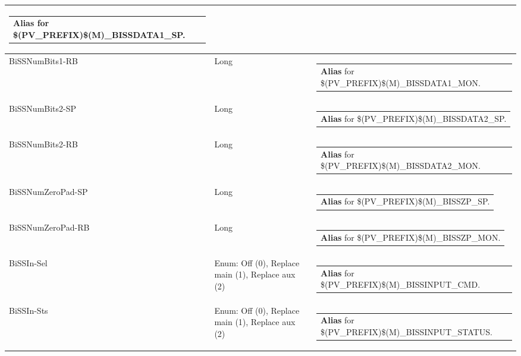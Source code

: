 \documentclass[openany]{article}
\begin{document}
\begin{longtable}{| m{4.5cm} m{2.5cm}  m{8.5cm} |}
\begin{tabular}{@{}m{6cm}@{}}
                \textbf{\color{blue} Alias} for \$(PV\_PREFIX)\$(M)\_BISSDATA1\_SP.
            \end{tabular} \hypertarget{}{}\\ \hline
        BiSSNumBits1-RB & Long & \begin{tabular}{@{}m{6cm}@{}}
                \textbf{\color{blue} Alias} for \$(PV\_PREFIX)\$(M)\_BISSDATA1\_MON.
            \end{tabular} \hypertarget{pv:biss-num-bits-2}{}\\ \hline
        BiSSNumBits2-SP & Long & \begin{tabular}{@{}m{6cm}@{}}
                \textbf{\color{blue} Alias} for \$(PV\_PREFIX)\$(M)\_BISSDATA2\_SP.
            \end{tabular} \hypertarget{}{}\\ \hline
        BiSSNumBits2-RB & Long & \begin{tabular}{@{}m{6cm}@{}}
                \textbf{\color{blue} Alias} for \$(PV\_PREFIX)\$(M)\_BISSDATA2\_MON.
            \end{tabular} \hypertarget{pv:biss-num-zero-pad}{}\\ \hline
        BiSSNumZeroPad-SP & Long & \begin{tabular}{@{}m{6cm}@{}}
                \textbf{\color{blue} Alias} for \$(PV\_PREFIX)\$(M)\_BISSZP\_SP.
            \end{tabular} \hypertarget{}{}\\ \hline
        BiSSNumZeroPad-RB & Long & \begin{tabular}{@{}m{6cm}@{}}
                \textbf{\color{blue} Alias} for \$(PV\_PREFIX)\$(M)\_BISSZP\_MON.
            \end{tabular} \hypertarget{pv:biss-in}{}\\ \hline
        BiSSIn-Sel & Enum: Off (0), Replace main (1), Replace aux (2) & \begin{tabular}{@{}m{6cm}@{}}
                \textbf{\color{blue} Alias} for \$(PV\_PREFIX)\$(M)\_BISSINPUT\_CMD.
            \end{tabular} \hypertarget{}{}\\ \hline
        BiSSIn-Sts & Enum: Off (0), Replace main (1), Replace aux (2) & \begin{tabular}{@{}m{6cm}@{}}
                \textbf{\color{blue} Alias} for \$(PV\_PREFIX)\$(M)\_BISSINPUT\_STATUS.

\end{tabular}
\end{longtable}
\end{document}
